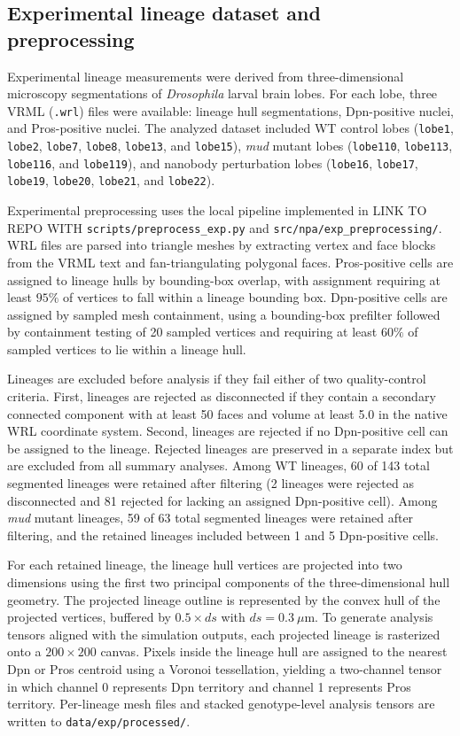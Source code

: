 \subsection{Experimental lineage dataset and preprocessing}

Experimental lineage measurements were derived from three-dimensional microscopy segmentations of \textit{Drosophila} larval brain lobes.
For each lobe, three VRML (\texttt{.wrl}) files were available: lineage hull segmentations, Dpn-positive nuclei, and Pros-positive nuclei.
The analyzed dataset included WT control lobes (\texttt{lobe1}, \texttt{lobe2}, \texttt{lobe7}, \texttt{lobe8}, \texttt{lobe13}, and \texttt{lobe15}), \textit{mud} mutant lobes (\texttt{lobe110}, \texttt{lobe113}, \texttt{lobe116}, and \texttt{lobe119}), and nanobody perturbation lobes (\texttt{lobe16}, \texttt{lobe17}, \texttt{lobe19}, \texttt{lobe20}, \texttt{lobe21}, and \texttt{lobe22}).

Experimental preprocessing uses the local pipeline implemented in LINK TO REPO WITH \texttt{scripts/preprocess\_exp.py} and \texttt{src/npa/exp\_preprocessing/}.
WRL files are parsed into triangle meshes by extracting vertex and face blocks from the VRML text and fan-triangulating polygonal faces.
Pros-positive cells are assigned to lineage hulls by bounding-box overlap, with assignment requiring at least $95\%$ of vertices to fall within a lineage bounding box.
Dpn-positive cells are assigned by sampled mesh containment, using a bounding-box prefilter followed by containment testing of 20 sampled vertices and requiring at least $60\%$ of sampled vertices to lie within a lineage hull.

Lineages are excluded before analysis if they fail either of two quality-control criteria.
First, lineages are rejected as disconnected if they contain a secondary connected component with at least 50 faces and volume at least 5.0 in the native WRL coordinate system.
Second, lineages are rejected if no Dpn-positive cell can be assigned to the lineage.
Rejected lineages are preserved in a separate index but are excluded from all summary analyses.
Among WT lineages, 60 of 143 total segmented lineages were retained after filtering (2 lineages were rejected as disconnected and 81 rejected for lacking an assigned Dpn-positive cell).
Among \textit{mud} mutant lineages, 59 of 63 total segmented lineages were retained after filtering, and the retained lineages included between 1 and 5 Dpn-positive cells.

For each retained lineage, the lineage hull vertices are projected into two dimensions using the first two principal components of the three-dimensional hull geometry.
The projected lineage outline is represented by the convex hull of the projected vertices, buffered by $0.5 \times ds$ with \(ds = 0.3~\mu\mathrm{m}\).
To generate analysis tensors aligned with the simulation outputs, each projected lineage is rasterized onto a \(200 \times 200\) canvas.
Pixels inside the lineage hull are assigned to the nearest Dpn or Pros centroid using a Voronoi tessellation, yielding a two-channel tensor in which channel 0 represents Dpn territory and channel 1 represents Pros territory.
Per-lineage mesh files and stacked genotype-level analysis tensors are written to \texttt{data/exp/processed/}.

